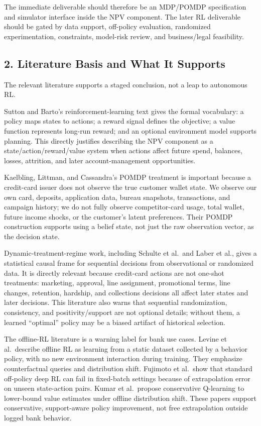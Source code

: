 \documentclass[
]{article}
\begin{document}
The immediate deliverable should therefore be an MDP/POMDP specification
and simulator interface inside the NPV component. The later RL
deliverable should be gated by data support, off-policy evaluation,
randomized experimentation, constraints, model-risk review, and
business/legal feasibility.

\hypertarget{literature-basis-and-what-it-supports}{%
\subsection{2. Literature Basis and What It
Supports}\label{literature-basis-and-what-it-supports}}

The relevant literature supports a staged conclusion, not a leap to
autonomous RL.

Sutton and Barto's reinforcement-learning text gives the formal
vocabulary: a policy maps states to actions; a reward signal defines the
objective; a value function represents long-run reward; and an optional
environment model supports planning. This directly justifies describing
the NPV component as a state/action/reward/value system when actions
affect future spend, balances, losses, attrition, and later
account-management opportunities.

Kaelbling, Littman, and Cassandra's POMDP treatment is important because
a credit-card issuer does not observe the true customer wallet state. We
observe our own card, deposits, application data, bureau snapshots,
transactions, and campaign history; we do not fully observe
competitor-card usage, total wallet, future income shocks, or the
customer's latent preferences. Their POMDP construction supports using a
belief state, not just the raw observation vector, as the decision
state.

Dynamic-treatment-regime work, including Schulte et al.~and Laber et
al., gives a statistical causal frame for sequential decisions from
observational or randomized data. It is directly relevant because
credit-card actions are not one-shot treatments: marketing, approval,
line assignment, promotional terms, line changes, retention, hardship,
and collections decisions all affect later states and later decisions.
This literature also warns that sequential randomization, consistency,
and positivity/support are not optional details; without them, a learned
``optimal'' policy may be a biased artifact of historical selection.

The offline-RL literature is a warning label for bank use cases. Levine
et al.~describe offline RL as learning from a static dataset collected
by a behavior policy, with no new environment interaction during
training. They emphasize counterfactual queries and distribution shift.
Fujimoto et al.~show that standard off-policy deep RL can fail in
fixed-batch settings because of extrapolation error on unseen
state-action pairs. Kumar et al.~propose conservative Q-learning to
lower-bound value estimates under offline distribution shift. These
papers support conservative, support-aware policy improvement, not free
extrapolation outside logged bank behavior.
\end{document}
